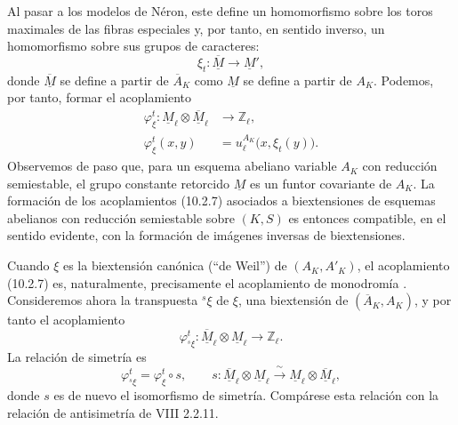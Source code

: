 Al pasar a los modelos de Néron, este define un homomorfismo sobre los
toros maximales de las fibras especiales y, por tanto, en sentido
inverso, un homomorfismo sobre sus grupos de caracteres:
\begin{equation}\tag{10.2.6}
\xi_t:\overline{\underline M}\longrightarrow\underline M',
\end{equation}
donde $\overline{\underline M}$ se define a partir de
$\overline A_K$ como $\underline M$ se define a partir de $A_K$.
Podemos, por tanto, formar el acoplamiento
\begin{equation}\tag{10.2.7}
\begin{aligned}
\varphi^t_\xi:\underline M_\ell\otimes
 \overline{\underline M}_\ell&\longrightarrow\mathbb Z_\ell,\\
\varphi^t_\xi(x,y)&=u_\ell^{A_K}\bigl(x,\xi_t(y)\bigr).
\end{aligned}
\end{equation}
Observemos de paso que, para un esquema abeliano variable $A_K$ con
reducción semiestable, el grupo constante retorcido $\underline M$ es
un funtor covariante de $A_K$. La formación de los acoplamientos
(10.2.7) asociados a biextensiones de esquemas abelianos con reducción
semiestable sobre $(K,S)$ es entonces compatible, en el sentido
evidente, con la formación de imágenes inversas de biextensiones.

Cuando $\xi$ es la biextensión canónica (``de Weil'') de
$(A_K,A'_K)$, el acoplamiento (10.2.7) es, naturalmente, precisamente
el acoplamiento de monodromía . Consideremos
ahora la transpuesta ${}^s\xi$ de $\xi$, una biextensión de
$(\overline A_K,A_K)$, y por tanto el acoplamiento
\begin{equation*}
\varphi^t_{{}^s\xi}:\overline{\underline M}_\ell\otimes
 \underline M_\ell\longrightarrow\mathbb Z_\ell.
\end{equation*}
La relación de simetría es
\begin{equation}\tag{10.2.8}
\varphi^t_{{}^s\xi}=\varphi^t_\xi\circ s,
\qquad
s:\overline{\underline M}_\ell\otimes\underline M_\ell
 \xrightarrow{\ \sim\ }
 \underline M_\ell\otimes\overline{\underline M}_\ell,
\end{equation}
donde $s$ es de nuevo el isomorfismo de simetría. Compárese esta
relación con la relación de antisimetría de VIII 2.2.11.
